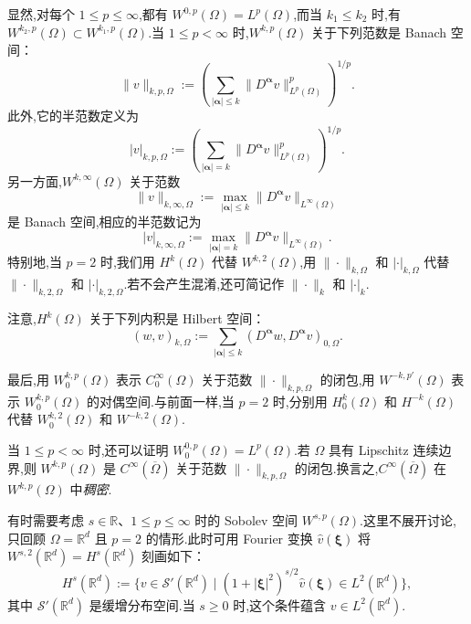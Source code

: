 显然,对每个 \(1\le p\le\infty\),都有 \(W^{0,p}(\Omega)=L^p(\Omega)\),而当 \(k_1\le k_2\) 时,有 \(W^{k_2,p}(\Omega)\subset W^{k_1,p}(\Omega)\).当 \(1\le p<\infty\) 时,\(W^{k,p}(\Omega)\) 关于下列范数是 Banach 空间：
\begin{equation}\label{eq:1.2.12}
  \|v\|_{k,p,\Omega}:=
  \left(\sum_{|\boldsymbol{\alpha}|\le k}\|D^{\boldsymbol{\alpha}}v\|_{L^p(\Omega)}^p\right)^{1/p}.
\end{equation}
此外,它的半范数定义为
\begin{equation}\label{eq:1.2.13}
  |v|_{k,p,\Omega}:=
  \left(\sum_{|\boldsymbol{\alpha}|= k}\|D^{\boldsymbol{\alpha}}v\|_{L^p(\Omega)}^p\right)^{1/p}.
\end{equation}
另一方面,\(W^{k,\infty}(\Omega)\) 关于范数
\begin{equation}\label{eq:1.2.14}
  \|v\|_{k,\infty,\Omega}:=
  \max_{|\boldsymbol{\alpha}|\le k}\|D^{\boldsymbol{\alpha}}v\|_{L^\infty(\Omega)}
\end{equation}
是 Banach 空间,相应的半范数记为
\begin{equation}\label{eq:1.2.15}
  |v|_{k,\infty,\Omega}:=
  \max_{|\boldsymbol{\alpha}|=k}\|D^{\boldsymbol{\alpha}}v\|_{L^\infty(\Omega)}.
\end{equation}
特别地,当 \(p=2\) 时,我们用 \(H^k(\Omega)\) 代替 \(W^{k,2}(\Omega)\),用 \(\|\cdot\|_{k,\Omega}\) 和 \(|\cdot|_{k,\Omega}\) 代替 \(\|\cdot\|_{k,2,\Omega}\) 和 \(|\cdot|_{k,2,\Omega}\).若不会产生混淆,还可简记作 \(\|\cdot\|_k\) 和 \(|\cdot|_k\).

注意,\(H^k(\Omega)\) 关于下列内积是 Hilbert 空间：
\begin{equation}\label{eq:1.2.16}
  (w,v)_{k,\Omega}:=\sum_{|\boldsymbol{\alpha}|\le k}
  (D^{\boldsymbol{\alpha}}w,D^{\boldsymbol{\alpha}}v)_{0,\Omega}.
\end{equation}

最后,用 \(W^{k,p}_0(\Omega)\) 表示 \(C^\infty_0(\Omega)\) 关于范数 \(\|\cdot\|_{k,p,\Omega}\) 的闭包,用 \(W^{-k,p'}(\Omega)\) 表示 \(W^{k,p}_0(\Omega)\) 的对偶空间.与前面一样,当 \(p=2\) 时,分别用 \(H^k_0(\Omega)\) 和 \(H^{-k}(\Omega)\) 代替 \(W^{k,2}_0(\Omega)\) 和 \(W^{-k,2}(\Omega)\).

当 \(1\le p<\infty\) 时,还可以证明 \(W^{0,p}_0(\Omega)=L^p(\Omega)\).若 \(\Omega\) 具有 Lipschitz 连续边界,则 \(W^{k,p}(\Omega)\) 是 \(C^\infty(\overline\Omega)\) 关于范数 \(\|\cdot\|_{k,p,\Omega}\) 的闭包.换言之,\(C^\infty(\overline\Omega)\) 在 \(W^{k,p}(\Omega)\) 中\emph{稠密}.

有时需要考虑 \(s\in\mathbb R\)、\(1\le p\le\infty\) 时的 Sobolev 空间 \(W^{s,p}(\Omega)\).这里不展开讨论,只回顾 \(\Omega=\mathbb R^d\) 且 \(p=2\) 的情形.此时可用 Fourier 变换 \(\widehat v(\boldsymbol{\xi})\) 将 \(W^{s,2}(\mathbb R^d)=H^s(\mathbb R^d)\) 刻画如下：
\begin{equation}\label{eq:1.2.17}
  H^s(\mathbb R^d):=
  \bigl\{v\in\mathcal S'(\mathbb R^d)\mid
  (1+|\boldsymbol{\xi}|^2)^{s/2}\widehat v(\boldsymbol{\xi})\in L^2(\mathbb R^d)\bigr\},
\end{equation}
其中 \(\mathcal S'(\mathbb R^d)\) 是缓增分布空间.当 \(s\ge 0\) 时,这个条件蕴含 \(v\in L^2(\mathbb R^d)\).

